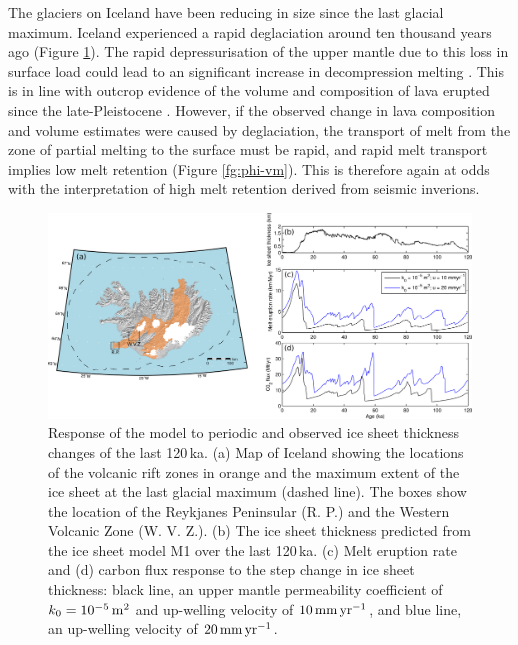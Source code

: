 The glaciers on Iceland have been reducing in size since the last glacial maximum. Iceland experienced a rapid deglaciation around ten thousand years ago (Figure \ref{fg:iceland-map}). The rapid depressurisation of the upper mantle due to this loss in surface load could lead to an significant increase in decompression melting \citep{jull-1996}. This is in line with outcrop evidence of the volume and composition of lava erupted since the late-Pleistocene \citep{maclennan-etal-2002,sinton-etal-2005,eksinchol-etal-2019}. However, if the observed change in lava composition and volume estimates were caused by deglaciation, the transport of melt from the zone of partial melting to the surface must be rapid, and rapid melt transport implies low melt retention (Figure \ref{fg:phi-vm}). This is therefore again at odds with the interpretation of high melt retention derived from seismic inverions.

\begin{figure}
\centering
\includegraphics[width=\textwidth]{./figures/ch2-iceland-map.png}
\caption{Response of the model to periodic and observed ice sheet thickness changes of the last 120\,ka. (a) Map of Iceland showing the locations of the volcanic rift zones in orange and the maximum extent of the ice sheet at the last glacial maximum (dashed line). The boxes show the location of the Reykjanes Peninsular (R. P.) and the Western Volcanic Zone (W. V. Z.). (b) The ice sheet thickness predicted from the ice sheet model M1 over the last 120\,ka. (c) Melt eruption rate and (d) carbon flux response to the step change in ice sheet thickness: black line, an upper mantle permeability coefficient of $k_{0} = 10^{-5}\rm\,m^{2}$ and up-welling velocity of $10\rm\,mm\,yr^{-1}$, and blue line, an up-welling velocity of $20\rm\,mm\,yr^{-1}$.}
\label{fg:iceland-map}
\end{figure}

